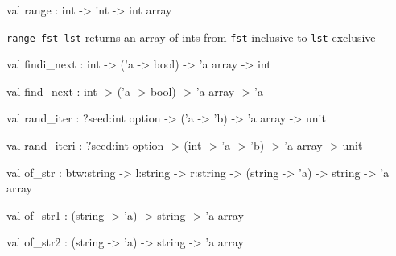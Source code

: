 \documentclass[11pt]{article}
\begin{document}
\begin{ocamldocsigend}
\label{val:Util.A.range}\begin{ocamldoccode}
val range : int -> int -> int array
\end{ocamldoccode}
\begin{ocamldocdescription}
{\tt{range fst lst}} returns an array of ints from {\tt{fst}} inclusive to {\tt{lst}} exclusive


\end{ocamldocdescription}


\label{val:Util.A.findi-underscorenext}\begin{ocamldoccode}
val findi_next : int -> ('a -> bool) -> 'a array -> int
\end{ocamldoccode}


\label{val:Util.A.find-underscorenext}\begin{ocamldoccode}
val find_next : int -> ('a -> bool) -> 'a array -> 'a
\end{ocamldoccode}


\label{val:Util.A.rand-underscoreiter}\begin{ocamldoccode}
val rand_iter : ?seed:int option -> ('a -> 'b) -> 'a array -> unit
\end{ocamldoccode}


\label{val:Util.A.rand-underscoreiteri}\begin{ocamldoccode}
val rand_iteri : ?seed:int option -> (int -> 'a -> 'b) -> 'a array -> unit
\end{ocamldoccode}


\label{val:Util.A.of-underscorestr}\begin{ocamldoccode}
val of_str :
  btw:string -> l:string -> r:string -> (string -> 'a) -> string -> 'a array
\end{ocamldoccode}


\label{val:Util.A.of-underscorestr1}\begin{ocamldoccode}
val of_str1 : (string -> 'a) -> string -> 'a array
\end{ocamldoccode}


\label{val:Util.A.of-underscorestr2}\begin{ocamldoccode}
val of_str2 : (string -> 'a) -> string -> 'a array
\end{ocamldoccode}



\end{ocamldocsigend}
\end{document}
